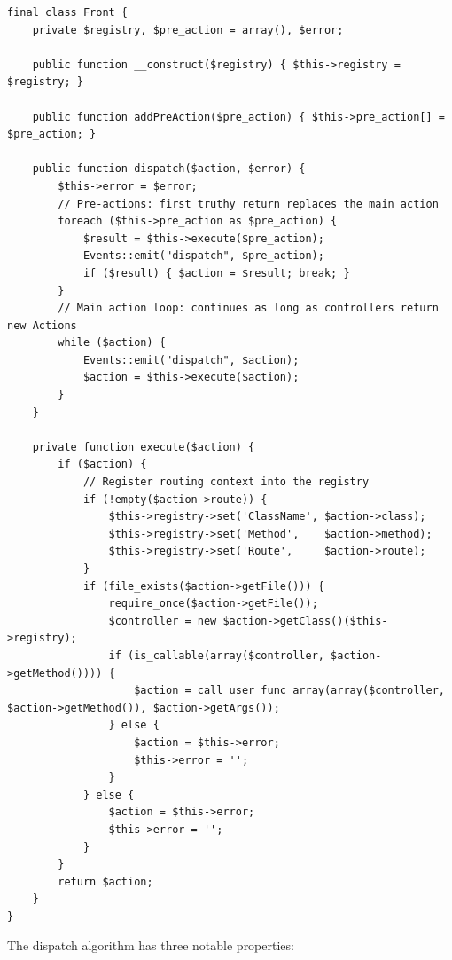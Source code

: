 \documentclass[11pt,a4paper]{article}
\begin{document}
\begin{lstlisting}[caption={\texttt{system/engine/front.php} --- the dispatch loop.},label={lst:front}]
final class Front {
    private $registry, $pre_action = array(), $error;

    public function __construct($registry) { $this->registry = $registry; }

    public function addPreAction($pre_action) { $this->pre_action[] = $pre_action; }

    public function dispatch($action, $error) {
        $this->error = $error;
        // Pre-actions: first truthy return replaces the main action
        foreach ($this->pre_action as $pre_action) {
            $result = $this->execute($pre_action);
            Events::emit("dispatch", $pre_action);
            if ($result) { $action = $result; break; }
        }
        // Main action loop: continues as long as controllers return new Actions
        while ($action) {
            Events::emit("dispatch", $action);
            $action = $this->execute($action);
        }
    }

    private function execute($action) {
        if ($action) {
            // Register routing context into the registry
            if (!empty($action->route)) {
                $this->registry->set('ClassName', $action->class);
                $this->registry->set('Method',    $action->method);
                $this->registry->set('Route',     $action->route);
            }
            if (file_exists($action->getFile())) {
                require_once($action->getFile());
                $controller = new $action->getClass()($this->registry);
                if (is_callable(array($controller, $action->getMethod()))) {
                    $action = call_user_func_array(array($controller, $action->getMethod()), $action->getArgs());
                } else {
                    $action = $this->error;
                    $this->error = '';
                }
            } else {
                $action = $this->error;
                $this->error = '';
            }
        }
        return $action;
    }
}
\end{lstlisting}

The dispatch algorithm has three notable properties:
\end{document}
